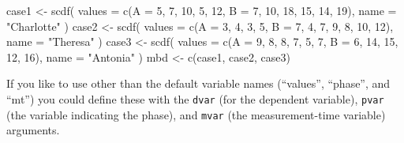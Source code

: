 \documentclass[
]{book}
\newenvironment{Shaded}{\begin{snugshade}}{\end{snugshade}}
\newcommand{\AttributeTok}[1]{\textcolor[rgb]{0.77,0.63,0.00}{#1}}
\newcommand{\DecValTok}[1]{\textcolor[rgb]{0.00,0.00,0.81}{#1}}
\newcommand{\FunctionTok}[1]{\textcolor[rgb]{0.00,0.00,0.00}{#1}}
\newcommand{\NormalTok}[1]{#1}
\newcommand{\OtherTok}[1]{\textcolor[rgb]{0.56,0.35,0.01}{#1}}
\newcommand{\StringTok}[1]{\textcolor[rgb]{0.31,0.60,0.02}{#1}}
\begin{document}
\begin{Shaded}
\begin{Highlighting}[]
\NormalTok{case1 }\OtherTok{\textless{}{-}} \FunctionTok{scdf}\NormalTok{(}
  \AttributeTok{values =} \FunctionTok{c}\NormalTok{(}\AttributeTok{A =} \DecValTok{5}\NormalTok{, }\DecValTok{7}\NormalTok{, }\DecValTok{10}\NormalTok{, }\DecValTok{5}\NormalTok{, }\DecValTok{12}\NormalTok{, }\AttributeTok{B =} \DecValTok{7}\NormalTok{, }\DecValTok{10}\NormalTok{, }\DecValTok{18}\NormalTok{, }\DecValTok{15}\NormalTok{, }\DecValTok{14}\NormalTok{, }\DecValTok{19}\NormalTok{), }
  \AttributeTok{name =} \StringTok{"Charlotte"}
\NormalTok{)}
\NormalTok{case2 }\OtherTok{\textless{}{-}} \FunctionTok{scdf}\NormalTok{(}
  \AttributeTok{values =} \FunctionTok{c}\NormalTok{(}\AttributeTok{A =} \DecValTok{3}\NormalTok{, }\DecValTok{4}\NormalTok{, }\DecValTok{3}\NormalTok{, }\DecValTok{5}\NormalTok{, }\AttributeTok{B =} \DecValTok{7}\NormalTok{, }\DecValTok{4}\NormalTok{, }\DecValTok{7}\NormalTok{, }\DecValTok{9}\NormalTok{, }\DecValTok{8}\NormalTok{, }\DecValTok{10}\NormalTok{, }\DecValTok{12}\NormalTok{), }
  \AttributeTok{name =} \StringTok{"Theresa"}
\NormalTok{)}
\NormalTok{case3 }\OtherTok{\textless{}{-}} \FunctionTok{scdf}\NormalTok{(}
  \AttributeTok{values =} \FunctionTok{c}\NormalTok{(}\AttributeTok{A =} \DecValTok{9}\NormalTok{, }\DecValTok{8}\NormalTok{, }\DecValTok{8}\NormalTok{, }\DecValTok{7}\NormalTok{, }\DecValTok{5}\NormalTok{, }\DecValTok{7}\NormalTok{, }\AttributeTok{B =} \DecValTok{6}\NormalTok{, }\DecValTok{14}\NormalTok{, }\DecValTok{15}\NormalTok{, }\DecValTok{12}\NormalTok{, }\DecValTok{16}\NormalTok{), }
  \AttributeTok{name =} \StringTok{"Antonia"}
\NormalTok{)}
\NormalTok{mbd }\OtherTok{\textless{}{-}} \FunctionTok{c}\NormalTok{(case1, case2, case3)}
\end{Highlighting}
\end{Shaded}

If you like to use other than the default variable names (``values'', ``phase'', and ``mt'') you could define these with the \texttt{dvar} (for the dependent variable), \texttt{pvar} (the variable indicating the phase), and \texttt{mvar} (the measurement-time variable) arguments.
\end{document}
